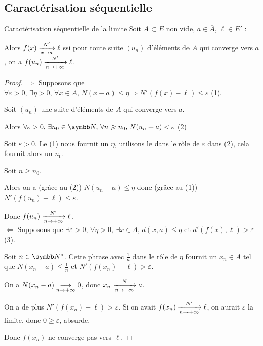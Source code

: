 \subsection{Caractérisation séquentielle}

\begin{theorement}{Caractérisation séquentielle de la limite}{}
    Soit $A \subset E$ non vide, $a \in \overline A$, $\ell \in E'$ :

    Alors $f(x) \limitnorme{N'}{x}{a} \ell$ ssi pour toute suite $(u_n)$ 
    d'éléments de $A$ qui converge vers $a$, on a $f(u_n) \limitnorme{N'}{n}{+ \infty} \ell$.
\end{theorement}


\begin{proof}
    $\Rightarrow$ Supposons que $\forall \varepsilon > 0, \, \exists \eta > 0, \, \forall x \in A, \, N(x - a) \leqslant \eta \Rightarrow N'(f(x) - \ell) \leqslant \varepsilon$ (1).

    Soit $(u_n)$ une suite d'éléments de $A$ qui converge vers $a$.

    Alors $\forall \varepsilon > 0, \, \exists n_0 \in \N, \, \forall n \geqslant n_0, \, N(u_n - a) < \varepsilon$ (2)

    Soit $\varepsilon > 0$. Le (1) nous fournit un $\eta$, utilisons le dans le rôle de $\varepsilon$ dans (2),
    cela fournit alors un $n_0$.

    Soit $n \geqslant n_0$. 

    Alors on a (grâce au (2)) $N(u_n - a) \leqslant \eta$ donc (grâce au (1)) $N'(f(u_n) - \ell) \leqslant \varepsilon$.

    Donc $f(u_n) \limitnorme{N'}{n}{+ \infty} \ell$. \\

    $\Leftarrow$ Supposons que $\exists \varepsilon > 0, \, \forall \eta > 0, \, \exists x \in A, \, d(x, a) \leqslant \eta $ et $d'(f(x), \ell) > \varepsilon$ (3).

    Soit $n \in \N^*$. Cette phrase avec $\frac 1 n$ dans le rôle de $\eta$ fournit
    un $x_n \in A$ tel que $N(x_n - a) \leqslant \frac 1 n$ et $N'(f(x_n) - \ell) > \varepsilon$.

    On a $N(x_n - a) \limit n {+ \infty} 0$, donc $x_n \limitnorme N n {+ \infty} a$.

    On a de plus $N'(f(x_n) - \ell) > \varepsilon$. Si on avait $f(x_n) \limitnorme{N'}{n}{+ \infty} \ell$, 
    on aurait $\varepsilon$ la limite, donc $0 \geqslant \varepsilon$, absurde.

    Donc $f(x_n)$ ne converge pas vers $\ell$.
\end{proof}

